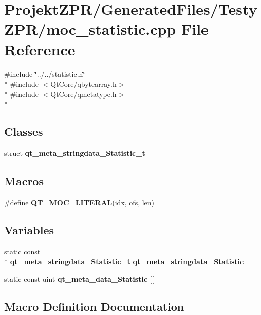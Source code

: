 \section{Projekt\-Z\-P\-R/\-Generated\-Files/\-Testy\-Z\-P\-R/moc\-\_\-statistic.cpp File Reference}
\label{_testy_z_p_r_2moc__statistic_8cpp}
{\ttfamily \#include \char`\"{}../../statistic.\-h\char`\"{}}\\*
{\ttfamily \#include $<$Qt\-Core/qbytearray.\-h$>$}\\*
{\ttfamily \#include $<$Qt\-Core/qmetatype.\-h$>$}\\*
\subsection*{Classes}
\begin{DoxyCompactItemize}
\item 
struct {\bf qt\-\_\-meta\-\_\-stringdata\-\_\-\-Statistic\-\_\-t}
\end{DoxyCompactItemize}
\subsection*{Macros}
\begin{DoxyCompactItemize}
\item 
\#define {\bf Q\-T\-\_\-\-M\-O\-C\-\_\-\-L\-I\-T\-E\-R\-A\-L}(idx, ofs, len)
\end{DoxyCompactItemize}
\subsection*{Variables}
\begin{DoxyCompactItemize}
\item 
static const \\*
{\bf qt\-\_\-meta\-\_\-stringdata\-\_\-\-Statistic\-\_\-t} {\bf qt\-\_\-meta\-\_\-stringdata\-\_\-\-Statistic}
\item 
static const uint {\bf qt\-\_\-meta\-\_\-data\-\_\-\-Statistic} [$\,$]
\end{DoxyCompactItemize}


\subsection{Macro Definition Documentation}
